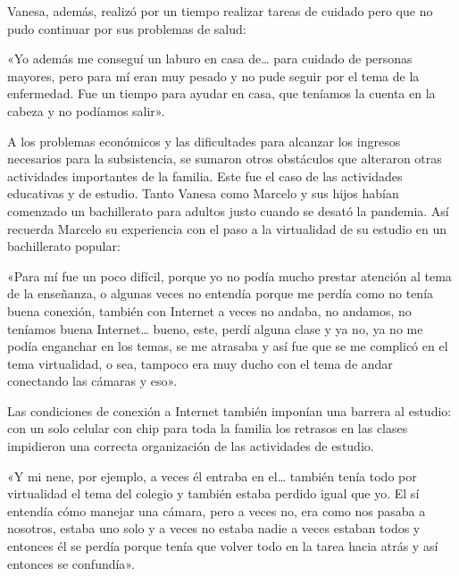 \begin{refsection}
Vanesa, además, realizó por un tiempo realizar tareas de cuidado pero que no pudo continuar por sus problemas de salud:


\begin{gbcita}
«Yo además me conseguí un laburo en casa de… para cuidado de personas mayores, pero para mí eran muy pesado y no pude seguir por el tema de la enfermedad. Fue un tiempo para ayudar en casa, que teníamos la cuenta en la cabeza y no podíamos salir».

\end{gbcita}

A los problemas económicos y las dificultades para alcanzar los ingresos necesarios para la subsistencia, se sumaron otros obstáculos que alteraron otras actividades importantes de la familia. Este fue el caso de las actividades educativas y de estudio. Tanto Vanesa como Marcelo y sus hijos habían comenzado un bachillerato para adultos justo cuando se desató la pandemia. Así recuerda Marcelo su experiencia con el paso a la virtualidad de su estudio en un bachillerato popular:


\begin{gbcita}
«Para mí fue un poco difícil, porque yo no podía mucho prestar atención al tema de la enseñanza, o algunas veces no entendía porque me perdía como no tenía buena conexión, también con Internet a veces no andaba, no andamos, no teníamos buena Internet… bueno, este, perdí alguna clase y ya no, ya no me podía enganchar en los temas, se me atrasaba y así fue que se me complicó en el tema virtualidad, o sea, tampoco era muy ducho con el tema de andar conectando las cámaras y eso».

\end{gbcita}

Las condiciones de conexión a Internet también imponían una barrera al estudio: con un solo celular con chip para toda la familia los retrasos en las clases impidieron una correcta organización de las actividades de estudio.


\begin{gbcita}
«Y mi nene, por ejemplo, a veces él entraba en el… también tenía todo por virtualidad el tema del colegio y también estaba perdido igual que yo. El sí entendía cómo manejar una cámara, pero a veces no, era como nos pasaba a nosotros, estaba uno solo y a veces no estaba nadie a veces estaban todos y entonces él se perdía porque tenía que volver todo en la tarea hacia atrás y así entonces se confundía».

\end{gbcita}


\end{refsection}
